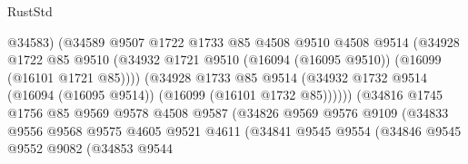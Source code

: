 \begin{lexlean}{RustStd}
\begin{coremodule}
                                      @34583)
                                    (@34589
                                      @9507
                                      @1722
                                      @1733
                                      @85
                                      @4508
                                      @9510
                                      @4508
                                      @9514
                                      (@34928
                                        @1722
                                        @85
                                        @9510
                                        (@34932
                                          @1721
                                          @9510
                                          (@16094 (@16095 @9510))
                                          (@16099 (@16101 @1721 @85))))
                                      (@34928
                                        @1733
                                        @85
                                        @9514
                                        (@34932
                                          @1732
                                          @9514
                                          (@16094 (@16095 @9514))
                                          (@16099 (@16101 @1732 @85))))))
                                  (@34816
                                    @1745
                                    @1756
                                    @85
                                    @9569
                                    @9578
                                    @4508
                                    @9587
                                    (@34826
                                      @9569
                                      @9576
                                      @9109
                                      (@34833
                                        @9556
                                        @9568
                                        @9575
                                        @4605
                                        @9521
                                        @4611
                                        (@34841
                                          @9545
                                          @9554
                                          (@34846
                                            @9545
                                            @9552
                                            @9082
                                            (@34853
                                              @9544

\end{coremodule}
\end{lexlean}
